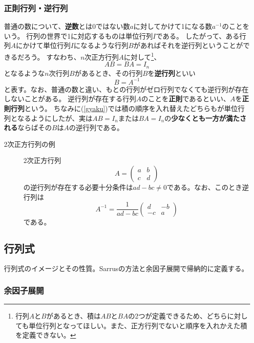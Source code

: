 \documentclass[10pt]{jsreport}
\theoremstyle{definition}%
\numberwithin{equation}{section}%
\begin{document}
\subsubsection{正則行列・逆行列}
普通の数について、{\bf 逆数}とは0ではない数$a$に対してかけて1になる数$a^{-1}$のことをいう。
行列の世界で1に対応するものは単位行列$I$である。
したがって、ある行列$A$にかけて単位行列$I$になるような行列$B$があればそれを逆行列ということができるだろう。
すなわち、$n$次正方行列$A$に対して\footnote{行列$A$と$B$があるとき、積は$AB$と$BA$の2つが定義できるため、どちらに対しても単位行列となってほしい。また、正方行列でないと順序を入れかえた積を定義できない。}、
\begin{equation}
\label{gyaku}  AB=BA=I_{n}
\end{equation}
となるような$n$次行列$B$があるとき、その行列$B$を{\bf 逆行列}といい
\begin{equation}
  B=A^{-1}
\end{equation}
と表す。なお、普通の数と違い、もとの行列がゼロ行列でなくても逆行列が存在しないことがある。
逆行列が存在する行列$A$のことを{\bf 正則}であるといい、$A$を{\bf 正則行列}という。
ちなみに(\ref{gyaku})では積の順序を入れ替えたどちらもが単位行列となるようにしたが、実は$AB=I_{n}$または$BA=I_{n}$の{\bf 少なくとも一方が満たされる}ならばその$B$は$A$の逆行列である。
\begin{description}
  \item[2次正方行列の例] 2次正方行列
  \begin{equation}
    A=\begin{pmatrix}
      a & b \\
      c & d
    \end{pmatrix}
  \end{equation}
  の逆行列が存在する必要十分条件は$ad-bc\neq 0$である。なお、このとき逆行列は
  \begin{equation}
    A^{-1}=\frac{1}{ad-bc}\begin{pmatrix}
      d & -b\\
      -c & a
    \end{pmatrix}
  \end{equation}
  である。
\end{description}
\subsection{行列式}
行列式のイメージとその性質。Sarrusの方法と余因子展開で帰納的に定義する。
\subsubsection{余因子展開}
\end{document}
